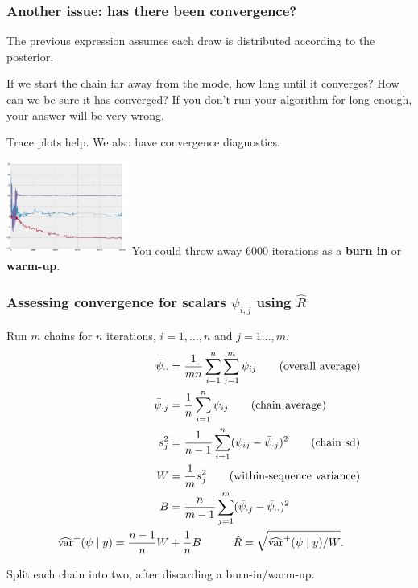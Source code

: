 \documentclass{beamer}
\begin{document}
\begin{frame}
\frametitle{Another issue: has there been convergence?}

The previous expression assumes each draw is distributed according to the posterior. 
\newline

If we start the chain far away from the mode, how long until it converges? How can we be sure it has converged? If you don't run your algorithm for long enough, your answer will be very wrong.
\newline
\pause

Trace plots help. We also have convergence diagnostics.
\newline

\includegraphics[width=40mm]{convergence.png} You could throw away $6000$ iterations as a {\bf burn in} or {\bf warm-up}.

\end{frame}

\begin{frame}
\frametitle{Assessing convergence for scalars $\psi_{i,j}$ using $\hat{R}$}

Run $m$ chains for $n$ iterations, $i=1,\ldots,n$ and $j=1\ldots,m$.
\begin{align*}
\bar{\psi}_{\cdot \cdot} &= \frac{1}{mn}\sum_{i=1}^n\sum_{j=1}^m \psi_{ij} \tag{overall average} \\
\bar{\psi}_{\cdot j} &= \frac{1}{n}\sum_{i=1}^n \psi_{ij} \tag{chain average} \\
s^2_j &= \frac{1}{n-1}\sum_{i=1}^n (\psi_{ij}-\bar{\psi}_{\cdot j})^2 \tag{chain sd} \\
W &= \frac{1}{m} s^2_j \tag{within-sequence variance} \\
B &= \frac{n}{m-1} \sum_{j=1}^m (\bar{\psi}_{\cdot j} - \bar{\psi}_{\cdot \cdot})^2\\
\widehat{\text{var}}^{+}(\psi \mid y) =\frac{n-1}{n}W &+ \frac{1}{n}B \hspace{10mm} \hat{R} = \sqrt{\widehat{\text{var}}^{+}(\psi \mid y) / W}.
\end{align*}

Split each chain into two, after discarding a burn-in/warm-up.
\end{frame}
\end{document}
